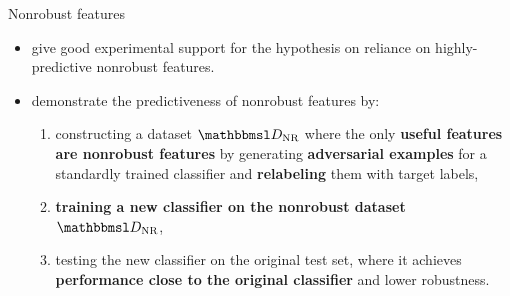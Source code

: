 \documentclass{beamer}
\newcommand{\citet}[1]{{\color{citecolor}\relscale{0.8}\textcite{#1}}}
\begin{document}
\begin{frame}[allowframebreaks=0.9]{Nonrobust features}
	\begin{itemize}
		\item \citet{Ilyas:2019:AENBTF} give good experimental support for the hypothesis on reliance on highly-predictive nonrobust features.
		\item \citet{Ilyas:2019:AENBTF} demonstrate the predictiveness of nonrobust features by: 
		\begin{enumerate}
			\item constructing a dataset $\set D_\text{NR}$ where the only \textbf{useful features are nonrobust features} by generating \textbf{adversarial examples} for a standardly trained classifier and \textbf{relabeling} them with target labels,
			\item \textbf{training a new classifier on the nonrobust dataset} $\set D_\text{NR}$,
			\item testing the new classifier on the original test set, where it achieves \textbf{performance close to the original classifier} and lower robustness.
		\end{enumerate}
		

\end{itemize}
\end{frame}
\end{document}
